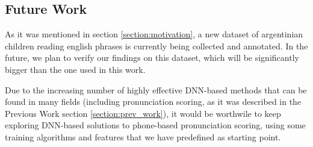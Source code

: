 \subsection{Future Work}

As it was mentioned in section \ref{section:motivation}, a new dataset of
argentinian children reading english phrases is currently being collected
and annotated. In the future, we plan to verify our findings on
this dataset, which will be significantly bigger than the one used in this work.



Due to the increasing number of highly effective DNN-based methods that can be found in
many fields (including pronunciation scoring,
as it was described in the Previous Work section \ref{section:prev_work}),
it would be worthwile to
keep exploring DNN-based solutions to phone-based pronunciation scoring, using
some training algorithms and features that we have predefined as starting point.


